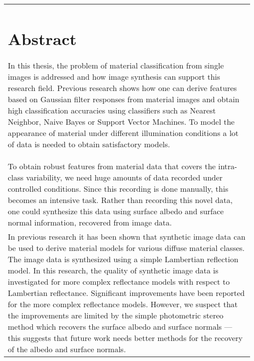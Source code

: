 \documentclass[11pt, a4paper,oneside]{book}
\begin{document}
	\thispagestyle{empty}
	\begin{center}
		\begin{tabular}{p{10cm}}
			\section*{Abstract}
			In this thesis, the problem of material classification from single images is addressed and how image synthesis can support this research field. Previous research shows how one can derive features based on Gaussian filter responses from material images and obtain high classification accuracies using classifiers such as Nearest Neighbor, Naive Bayes or Support Vector Machines. To model the appearance of material under different illumination conditions a lot of data is needed to obtain satisfactory models. \\[10px]

To obtain robust features from material data that covers the intra-class variability, we need huge amounts of data recorded under controlled conditions. Since this recording is done manually, this becomes an intensive task. Rather than recording this novel data, one could synthesize this data using surface albedo and surface normal information, recovered from image data. \\[10px]

In previous research it has been shown that synthetic image data can be used to derive material models for various diffuse material classes. The image data is synthesized using a simple Lambertian reflection model. In this research, the quality of synthetic image data is investigated for more complex reflectance models with respect to Lambertian reflectance. Significant improvements have been reported for the more complex reflectance models. However, we suspect that the improvements are limited by the simple photometric stereo method which recovers the surface albedo and surface normals --- this suggests that future work needs better methods for the recovery of the albedo and surface normals.
		\end{tabular}
	\end{center}

	\newpage
	\tableofcontents
	\newpage
	\hypersetup{pageanchor=true}
\end{document}
